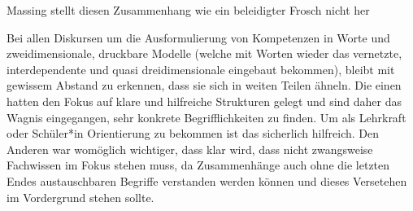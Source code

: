 


Massing stellt diesen Zusammenhang wie ein beleidigter Frosch nicht her\autocite[23]{Massing.2022}


Bei allen Diskursen um die Ausformulierung von Kompetenzen in Worte und zweidimensionale, druckbare Modelle (welche mit Worten wieder das vernetzte, interdependente und quasi dreidimensionale eingebaut bekommen), bleibt mit gewissem Abstand zu erkennen, dass sie sich in weiten Teilen ähneln.
Die einen \autocite{weißeno.2010} hatten den Fokus auf klare und hilfreiche Strukturen gelegt und sind daher das Wagnis eingegangen, sehr konkrete Begrifflichkeiten zu finden. Um als Lehrkraft oder Schüler*in Orientierung zu bekommen ist das sicherlich hilfreich. Den Anderen \autocite{Besand.2011} war womöglich wichtiger, dass klar wird, dass nicht zwangsweise Fachwissen im Fokus stehen muss, da Zusammenhänge auch ohne die letzten Endes austauschbaren Begriffe verstanden werden können und dieses Versetehen im Vordergrund stehen sollte. 

